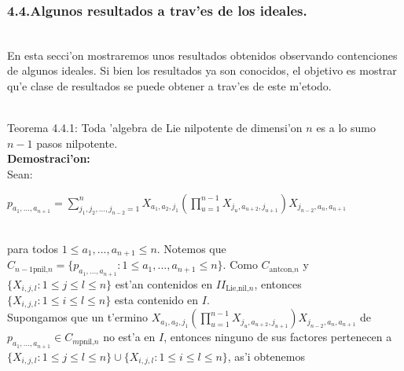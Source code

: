 \documentclass[10pt]{beamer}
\begin{document}
\begin{frame}
\frametitle{4.4.Algunos resultados a trav'es de los ideales.}\\
En esta secci'on mostraremos unos resultados obtenidos observando contenciones de algunos ideales. Si bien los resultados ya son conocidos, el objetivo es mostrar qu'e clase de resultados se puede obtener a trav'es de este m'etodo.\\ 
\\
\begin{block}{Teorema 4.4.1:}
Toda 'algebra de Lie nilpotente de dimensi'on $n$ es a lo sumo $n-1$ pasos nilpotente.\\ 
\textbf{Demostraci'on:}\\
Sean:\\
\begin{center}
$\displaystyle p_{a_1,...,a_{n+1}} = \displaystyle\sum_{j_1,j_2,...,j_{n-2}=1}^n X_{a_1,a_2,j_1}\left ( \prod_{u=1}^{n-1}{X_{j_{u},a_{u+2},j_{u+1}}} \right )X_{j_{n-2},a_{n},a_{n+1}}$\\ 
\end{center}
\\
para todos $1 \leq a_1,...,a_{n+1} \leq n$. Notemos que $C_{n-1{\text{pnil,}n}}=\{p_{a_1,...,a_{n+1}}: 1 \leq a_1,...,a_{n+1} \leq n\}$. 
Como $C_{\text{antcon,}n}$ y $\{ X _{i,j,l}:1 \leq j \leq l \leq n\}$ est'an contenidos en $II_{\text{Lie,nil,}n}$, entonces $\{ X _{i,j,l}:1 \leq i \leq l \leq n\}$ esta contenido en $I$.\\

Supongamos que un t'ermino $X_{a_1,a_2,j_1}\left ( \prod_{u=1}^{n-1}{X_{j_{u},a_{u+2},j_{u+1}}}\right )X_{j_{n-2},a_{n},a_{n+1}}$ de $p_{a_1,...,a_{n+1}}\in C_{m\text{pnil,}n}$ no est'a en $I$, entonces ninguno de sus factores pertenecen a $\{ X _{i,j,l}:1 \leq j \leq l \leq n\} \cup \{ X _{i,j,l}:1 \leq i \leq l \leq n\}$, as'i obtenemos\\
\end{block}
\end{frame}
\end{document}
